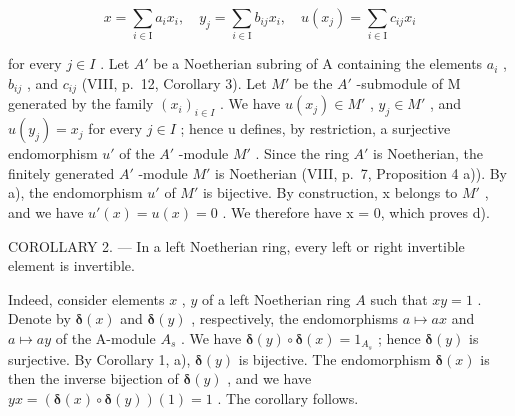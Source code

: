 \[
x = \sum_ {i \in \mathrm{I}} a _ {i} x _ {i}, \quad y _ {j} = \sum_ {i \in \mathrm{I}} b _ {i j} x _ {i}, \quad u (x _ {j}) = \sum_ {i \in \mathrm{I}} c _ {i j} x _ {i}
\]

for every \(j \in I\) . Let \(A'\) be a Noetherian subring of A containing the elements \(a_i\) , \(b_{ij}\) , and \(c_{ij}\) (VIII, p.~12, Corollary 3). Let \(M'\) be the \(A'\) -submodule of M generated by the family \((x_i)_{i \in I}\) . We have \(u(x_j) \in M'\) , \(y_j \in M'\) , and \(u(y_j) = x_j\) for every \(j \in I\) ; hence u defines, by restriction, a surjective endomorphism \(u'\) of the \(A'\) -module \(M'\) . Since the ring \(A'\) is Noetherian, the finitely generated \(A'\) -module \(M'\) is Noetherian (VIII, p.~7, Proposition 4 a)). By a), the endomorphism \(u'\) of \(M'\) is bijective. By construction, x belongs to \(M'\) , and we have \(u'(x) = u(x) = 0\) . We therefore have x = 0, which proves d).

COROLLARY 2. --- In a left Noetherian ring, every left or right invertible element is invertible.

Indeed, consider elements \(x\) , \(y\) of a left Noetherian ring \(A\) such that \(xy = 1\) . Denote by \(\pmb{\delta}(x)\) and \(\pmb{\delta}(y)\) , respectively, the endomorphisms \(a \mapsto ax\) and \(a \mapsto ay\) of the A-module \(A_s\) . We have \(\pmb{\delta}(y) \circ \pmb{\delta}(x) = 1_{A_s}\) ; hence \(\pmb{\delta}(y)\) is surjective. By Corollary 1, a), \(\pmb{\delta}(y)\) is bijective. The endomorphism \(\pmb{\delta}(x)\) is then the inverse bijection of \(\pmb{\delta}(y)\) , and we have \(yx = (\pmb{\delta}(x) \circ \pmb{\delta}(y))(1) = 1\) . The corollary follows.
\relax{}
